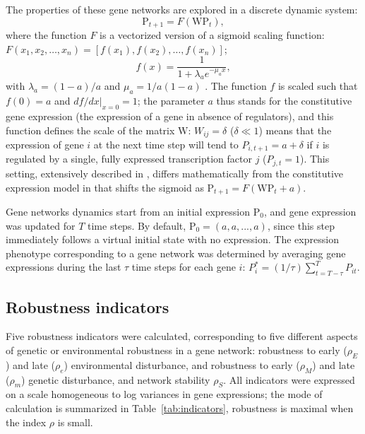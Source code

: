 \documentclass[10pt,a4paper]{article}
\newcommand{\stability}{{\rho_S}}
\newcommand{\earlyenv}{{\rho_E}}
\newcommand{\lateenv}{{\rho_e}}
\newcommand{\earlymut}{{\rho_M}}
\newcommand{\latemut}{{\rho_m}}
\newcommand{\W}{\bm{\mathrm W}}
\newcommand{\Pp}{\bm{\mathrm P}}
\begin{document}
The properties of these gene networks are explored in a discrete dynamic system:
\begin{equation}
 \Pp_{t+1} = F(\W \Pp_t),
\end{equation}
\noindent where the function $F$ is a vectorized version of a sigmoid scaling function: $F(x_1, x_2, \dots, x_n) = [f(x_1), f(x_2), \dots, f(x_n)]$;
\begin{equation} \label{eq:fx}
f(x) = \frac{1}{1+ \lambda_a e ^{- \mu_a x}}, 
\end{equation}
\noindent with $\lambda_a = (1-a)/a$ and $\mu_a = 1/a(1-a)$ \citep{GCL+18}. The function $f$ is scaled such that $f(0) = a$ and $df/dx|_{x=0}=1$; the parameter $a$ thus stands for the constitutive gene expression (the expression of a gene in absence of regulators), and this function defines the scale of the matrix $\W$: $W_{ij} = \delta$ ($\delta \ll 1$) means that the expression of gene $i$ at the next time step will tend to $P_{i,t+1} = a + \delta$ if $i$ is regulated by a single, fully expressed transcription factor $j$ ($P_{j,t} = 1$). This setting, extensively described in \citet{RL16}, differs mathematically from the constitutive expression model in \citet{Wag94} that shifts the sigmoid as $\Pp_{t+1} = F(\W \Pp_t + a)$.

Gene networks dynamics start from an initial expression $\Pp_0$, and gene expression was updated for $T$ time steps. By default, $\Pp_0 = (a, a, ..., a)$, since this step immediately follows a virtual initial state with no expression. The expression phenotype corresponding to a gene network was determined by averaging gene expressions during the last $\tau$ time steps for each gene $i$: $P_i^* = (1/\tau)\sum_{t=T-\tau}^T P_{it}$. 

\subsection{Robustness indicators}

Five robustness indicators were calculated, corresponding to five different aspects of genetic or environmental robustness in a gene network: robustness to early ($\earlyenv$) and late ($\lateenv$) environmental disturbance, and robustness to early ($\earlymut$) and late ($\latemut$) genetic disturbance, and network stability $\stability$. All indicators were expressed on a scale homogeneous to log variances in gene expressions; the mode of calculation is summarized in Table~\ref{tab:indicators}, robustness is maximal when the index $\rho$ is small. 
\end{document}
